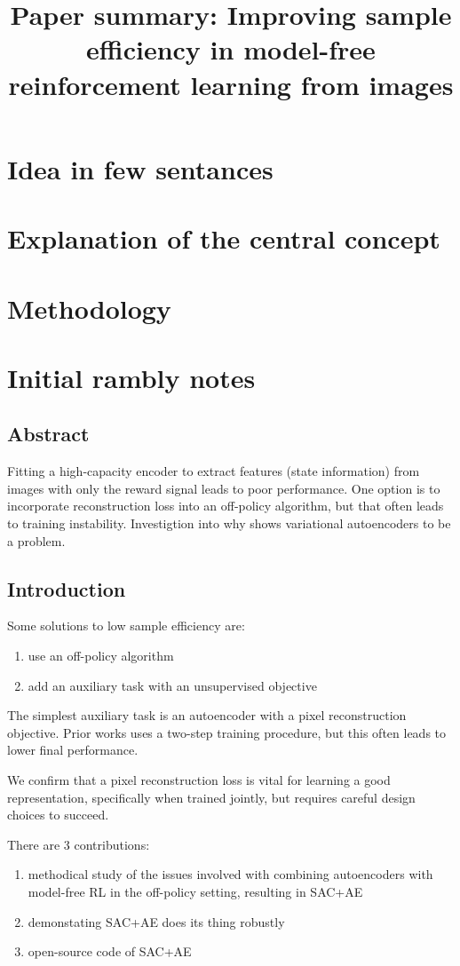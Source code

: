 \documentclass{article}
\title{Paper summary: Improving sample efficiency in model-free reinforcement learning from images}
\begin{document}
\maketitle


\section{Idea in few sentances}


\section{Explanation of the central concept}


\section{Methodology}


\section{Initial rambly notes}


\subsection{Abstract}
Fitting a high-capacity encoder to extract features (state information)
from images with only the reward signal leads to poor performance.
One option is to incorporate reconstruction loss into an off-policy algorithm,
but that often leads to training instability.
Investigtion into why shows variational autoencoders to be a problem.

\subsection{Introduction}
Some solutions to low sample efficiency are:
\begin{enumerate}
		\item use an off-policy algorithm
		\item add an auxiliary task with an unsupervised objective
\end{enumerate}
The simplest auxiliary task is an autoencoder with a pixel reconstruction objective.
Prior works uses a two-step training procedure,
but this often leads to lower final performance.
\begin{displayquote}
	We confirm that a pixel reconstruction loss is vital for learning a good
	representation, specifically when trained jointly,
	but requires careful design choices to succeed.
\end{displayquote}
There are 3 contributions:
\begin{enumerate}
		\item methodical study of the issues involved with combining autoencoders with model-free RL
				in the off-policy setting, resulting in SAC+AE
		\item demonstating SAC+AE does its thing robustly
		\item open-source code of SAC+AE
\end{enumerate}
\end{document}

